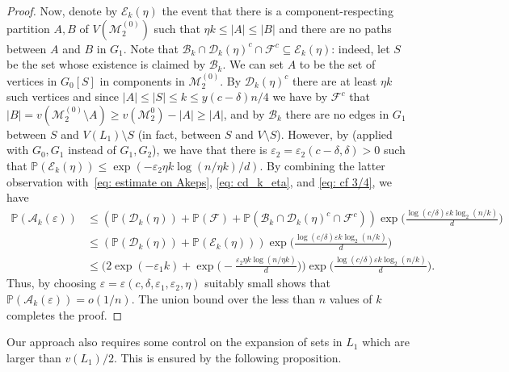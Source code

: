 \documentclass[reqno,final,a4paper]{amsart}
\theoremstyle{definition}
\newcommand{\cA}{\mathcal{A}}
\newcommand{\cB}{\mathcal{B}}
\newcommand{\cD}{\mathcal{D}}
\newcommand{\cE}{\mathcal{E}}
\newcommand{\cF}{\mathcal{F}}
\newcommand{\cM}{\mathcal{M}}
\def\eps{\varepsilon}
\newcommand{\1}{\mathbbm{1}}
\begin{document}
\begin{proof}
Now, denote by $\cE_k(\eta)$ the event that there is a component-respecting partition $A,B$ of $V(\cM_2^{(0)})$ such that $\eta k \le |A|\le |B|$ and there are no paths between $A$ and $B$ in $G_1$.
Note that $\cB_k\cap \cD_k(\eta)^c\cap \cF^c\subseteq \cE_k(\eta)$: indeed, let $S$ be the set whose existence is claimed by $\cB_k$. We can set $A$ to be the set of vertices in $G_0[S]$ in components in $\cM_2^{(0)}$. By $\cD_k(\eta)^c$ there are at least $\eta k$ such vertices and since $|A|\le |S|\le k\le y(c-\delta)n/4$ we have by $\cF^c$ that $|B|=v(\cM_2^{(0)}\setminus A)\ge v(\cM_2^{0})-|A|\ge |A|$, and by $\cB_k$ there are no edges in $G_1$ between $S$ and $V(L_1)\setminus S$ (in fact, between $S$ and $V\setminus S$).
However, by  (applied with $G_0,G_1$ instead of $G_1,G_2$), we have that there is $\eps_2 = \eps_2(c-\delta,\delta)>0$ such that $\mathbb P(\cE_k(\eta))\le \exp(-\eps_2 \eta k\log(n/\eta k)/d)$.
By combining the latter observation with~\eqref{eq: estimate on Akeps}, \eqref{eq: cd_k_eta}, and \eqref{eq: cf 3/4}, we have
\[\begin{split}
\mathbb P(\cA_k(\eps))
&\le (\mathbb P(\cD_k(\eta))+\mathbb{P}(\cF)+\mathbb P(\cB_k\cap \cD_k(\eta)^c\cap \cF^c))\exp\bigg(\frac{\log(c/\delta)\eps k\log_2(n/k)}{d}\bigg)\\
&\le (\mathbb P(\cD_k(\eta))+\mathbb P(\cE_k(\eta)))\exp\bigg(\frac{\log(c/\delta)\eps k\log_2(n/k)}{d}\bigg)\\
&\le \bigg(2\exp(-\eps_1 k)+\exp\bigg(-\frac{\eps_2\eta k\log(n/\eta k)}{d}\bigg)\bigg)\exp\bigg(\frac{\log(c/\delta)\eps k\log_2(n/k)}{d}\bigg).
\end{split}\]
Thus, by choosing $\eps = \eps(c,\delta,\eps_1,\eps_2,\eta)$ suitably small shows that $\mathbb P(\cA_k(\eps))=o(1/n)$. The union bound over the less than $n$ values of $k$ completes the proof.
\end{proof}

Our approach also requires some control on the expansion of sets in $L_1$ which are larger than $v(L_1)/2$. This is ensured by the following proposition.
\end{document}
